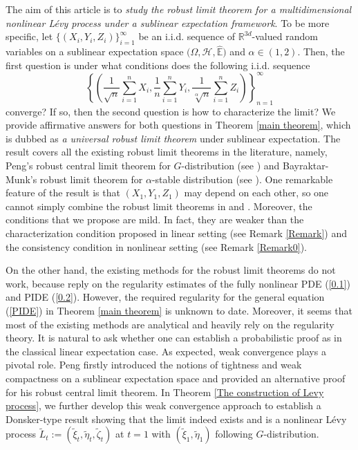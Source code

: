 \documentclass[a4paper,oneside,10pt]{article}%
\numberwithin{equation}{section}
\begin{document}
The aim of this article is to \emph{study the robust limit theorem for a
multidimensional nonlinear L\'evy process under a sublinear expectation
framework}. To be more specific, let $\{(X_{i},Y_{i},Z_{i})\}_{i=1}^{\infty}$
be an i.i.d. sequence of $\mathbb{R}^{3d}$-valued random variables on a
sublinear expectation space $(\Omega,\mathcal{H},\mathbb{\hat{E})}$ and
$\alpha \in(1,2)$. Then, the first question is under what conditions does the
following i.i.d. sequence
\[
\left \{  \left(  \frac{1}{\sqrt{n}}\sum_{i=1}^{n}X_{i},\frac{1}{n}\sum
_{i=1}^{n}Y_{i},\frac{1}{\sqrt[\alpha]{n}} \sum_{i=1}^{n}Z_{i}\right)
\right \}  _{n=1}^{\infty}%
\]
converge? If so, then the second question is how to characterize the limit? We
provide affirmative answers for both questions in Theorem \ref{main theorem},
which is dubbed as \emph{a universal robust limit theorem} under sublinear
expectation. The result covers all the existing robust limit theorems in the
literature, namely, Peng's robust central limit theorem for $G$-distribution
(see \cite{P20082}) and Bayraktar-Munk's robust limit theorem for $\alpha
$-stable distribution (see \cite{BM2016}). One remarkable feature of the
result is that $(X_{1},Y_{1},Z_{1})$ may depend on each other, so one cannot
simply combine the robust limit theorems in \cite{BM2016} and \cite{P20082}.
Moreover, the conditions that we propose are mild. In fact, they are weaker
than the characterization condition proposed in linear setting (see Remark
\ref{Remark}) and the consistency condition in nonlinear setting (see Remark
\ref{Remark0}).

On the other hand, the existing methods for the robust limit theorems do not
work, because \cite{BM2016,P20082} reply on the regularity estimates of the
fully nonlinear PDE (\ref{0.1}) and PIDE (\ref{0.2}). However, the required
regularity for the general equation (\ref{PIDE}) in Theorem \ref{main theorem}
is unknown to date. Moreover, it seems that most of the existing methods are
analytical and heavily rely on the regularity theory. It is natural to ask
whether one can establish a probabilistic proof as in the classical linear
expectation case. As expected, weak convergence plays a pivotal role. Peng
\cite{P2010_CLT} firstly introduced the notions of tightness and weak
compactness on a sublinear expectation space and provided an alternative proof
for his robust central limit theorem. In Theorem
\ref{The construction of Levy process}, we further develop this weak
convergence approach to establish a Donsker-type result showing that the limit
indeed exists and is a nonlinear L\'evy process $\tilde{L}_{t}:=(\tilde{\xi
}_{t},\tilde{\eta} _{t},\tilde{\zeta}_{t})$ at $t=1$ with $(\tilde{\xi}%
_{1},\tilde{\eta} _{1})$ following $G$-distribution.
\end{document}
